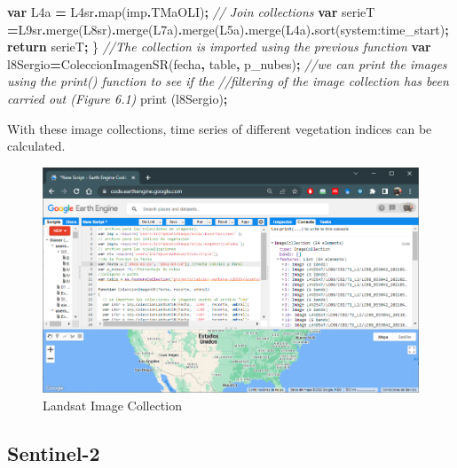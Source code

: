 \documentclass[
]{book}
\newenvironment{Shaded}{\begin{snugshade}}{\end{snugshade}}
\newcommand{\AttributeTok}[1]{\textcolor[rgb]{0.77,0.63,0.00}{#1}}
\newcommand{\CommentTok}[1]{\textcolor[rgb]{0.56,0.35,0.01}{\textit{#1}}}
\newcommand{\ControlFlowTok}[1]{\textcolor[rgb]{0.13,0.29,0.53}{\textbf{#1}}}
\newcommand{\FunctionTok}[1]{\textcolor[rgb]{0.00,0.00,0.00}{#1}}
\newcommand{\KeywordTok}[1]{\textcolor[rgb]{0.13,0.29,0.53}{\textbf{#1}}}
\newcommand{\NormalTok}[1]{#1}
\newcommand{\OperatorTok}[1]{\textcolor[rgb]{0.81,0.36,0.00}{\textbf{#1}}}
\newcommand{\StringTok}[1]{\textcolor[rgb]{0.31,0.60,0.02}{#1}}
\begin{document}
\begin{Shaded}
\begin{Highlighting}[]
  \KeywordTok{var}\NormalTok{ L4a }\OperatorTok{=}\NormalTok{ L4sr}\OperatorTok{.}\FunctionTok{map}\NormalTok{(imp}\OperatorTok{.}\AttributeTok{TMaOLI}\NormalTok{)}\OperatorTok{;}
  \CommentTok{// Join collections}
  \KeywordTok{var}\NormalTok{ serieT }\OperatorTok{=}\NormalTok{L9sr}\OperatorTok{.}\FunctionTok{merge}\NormalTok{(L8sr)}\OperatorTok{.}\FunctionTok{merge}\NormalTok{(L7a)}\OperatorTok{.}\FunctionTok{merge}\NormalTok{(L5a)}\OperatorTok{.}\FunctionTok{merge}\NormalTok{(L4a)}\OperatorTok{.}\FunctionTok{sort}\NormalTok{(}\StringTok{\textquotesingle{}system:time\_start\textquotesingle{}}\NormalTok{)}\OperatorTok{;}
    \ControlFlowTok{return}\NormalTok{ serieT}\OperatorTok{;}
\NormalTok{\}}
\CommentTok{//The collection is imported using the previous function }
\KeywordTok{var}\NormalTok{ l8Sergio}\OperatorTok{=}\FunctionTok{ColeccionImagenSR}\NormalTok{(fecha}\OperatorTok{,}\NormalTok{ table}\OperatorTok{,}\NormalTok{ p\_nubes)}\OperatorTok{;}
\CommentTok{//we can print the images using the print() function to see if the }
\CommentTok{//filtering of the image collection has been carried out (Figure 6.1) }
\FunctionTok{print}\NormalTok{ (l8Sergio)}\OperatorTok{;}
\end{Highlighting}
\end{Shaded}

With these image collections, time series of different vegetation indices can be calculated.

\begin{figure}

{\centering \includegraphics[width=0.85\linewidth]{./images/Figure70} 

}

\caption{Landsat Image Collection}\label{fig:figV1}
\end{figure}

\hypertarget{sentinel-2}{%
\subsection{Sentinel-2}\label{sentinel-2}}
\end{document}
